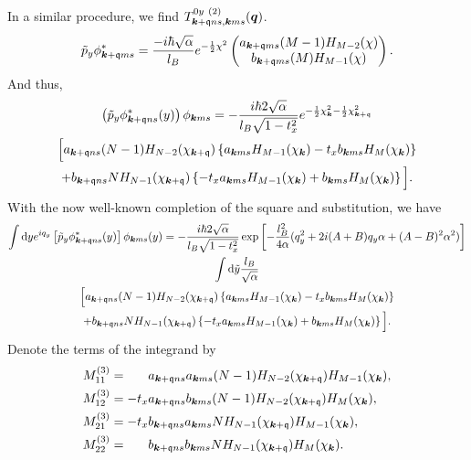 In a similar procedure, we find \( T^{0y~(2)}_{\bm{k}+\mathfrak{q} ns, \bm{k} ms}(\bm{q}) \).
\begin{equation}
  \tilde{p}_y \phi^{*}_{\bm{k}+\mathfrak{q} m s} = \frac{-i \hbar \sqrt{\alpha } }{l_{B}}  e^{-\frac{1}{2} \chi ^2}
                                   \begin{pmatrix}
                                     a_{\bm{k}+\mathfrak{q} m s} (M-1) H_{M-2} (\chi) \\
                                     b_{\bm{k}+\mathfrak{q} m s} (M) H_{M-1} (\chi)
                                   \end{pmatrix}.
\end{equation}
And thus,
\begin{multline}
  \left( \tilde{p}_y \phi ^{*} _{\bm{k} + \mathfrak{q} ns} (y) \right) \phi _{\bm{k} m s}
  = -\frac{i\hbar 2 \sqrt{\alpha } }{l_{B} \sqrt{1 - t_{x}^2} }
  e^{-\frac{1}{2} \chi _{\bm{k}}^2 - \frac{1}{2} \chi _{\bm{k} + \mathfrak{q}} ^2}\\
  \Big[
  a_{\bm{k} + \mathfrak{q} ns} (N-1) H_{N-2}(\chi_{\bm{k}+\mathfrak{q}})
  \left\{a_{\bm{k} ms} H_{M-1} (\chi_{\bm{k}}) - t_{x} b_{\bm{k} ms} H_{M} (\chi_{\bm{k}})\right\}\\
  +
  b_{\bm{k} + \mathfrak{q} ns} N H_{N-1} (\chi_{\bm{k} + \mathfrak{q}})
  \left\{-t_{x} a_{\bm{k} ms}  H_{M-1} (\chi_{\bm{k}}) + b_{\bm{k} ms} H_{M} (\chi_{\bm{k}})\right\}
  \Big].
\end{multline}
With the now well-known completion of the square and substitution, we have
\begin{multline}
  \int \mathrm{d}y
  e^{i q_{y}}
  \left[\tilde{p}_y \phi ^{*}_{\bm{k} + \mathfrak{q} ns}(y) \right]
  \phi_{\bm{k} ms} (y)
  =
  - \frac{i\hbar 2 \sqrt{\alpha} }{l_{B} \sqrt{1 - t_{x}^2} }
  \exp
  \left[
    - \frac{l_{B}^2}{4 \alpha } (q_{y}^2 + 2 i (A+B) q_{y} \alpha + (A-B)^2\alpha^2)
  \right  ]\\
  \int \mathrm{d} \tilde{y} \frac{l_{B}}{\sqrt{\alpha } }\\
  \Big[
  a_{\bm{k} + \mathfrak{q} ns} (N-1) H_{N-2}(\chi_{\bm{k}+\mathfrak{q}})
  \left\{a_{\bm{k} ms} H_{M-1} (\chi_{\bm{k}}) - t_{x} b_{\bm{k} ms} H_{M} (\chi_{\bm{k}})\right\}\\
  +
  b_{\bm{k} + \mathfrak{q} ns} N H_{N-1} (\chi_{\bm{k} + \mathfrak{q}})
  \left\{-t_{x} a_{\bm{k} ms}  H_{M-1} (\chi_{\bm{k}}) + b_{\bm{k} ms} H_{M} (\chi_{\bm{k}})\right\}
  \Big].
\end{multline}
Denote the terms of the integrand by
\begin{align}
  M^{(3)}_{11} &= \phantom{-t_x} a_{\bm{k} + \mathfrak{q} ns} a_{\bm{k} ms} (N-1) H_{N-2} (\chi_{\bm{k} + \mathfrak{q}}) H_{M-1} (\chi_{\bm{k}}),\\
  M^{(3)}_{12} &= -t_x a_{\bm{k} + \mathfrak{q} ns} b_{\bm{k} ms} (N-1) H_{N-2} (\chi_{\bm{k} + \mathfrak{q}}) H_{M} (\chi_{\bm{k}}),\\
  M^{(3)}_{21} &= -t_x b_{\bm{k} + \mathfrak{q} ns} a_{\bm{k} ms} N H_{N-1} (\chi_{\bm{k} + \mathfrak{q}}) H_{M-1} (\chi_{\bm{k}}),\\
  M^{(3)}_{22} &= \phantom{-t_x} b_{\bm{k} + \mathfrak{q} ns} b_{\bm{k} ms} N H_{N-1} (\chi_{\bm{k} + \mathfrak{q}}) H_{M} (\chi_{\bm{k}}).
\end{align}
